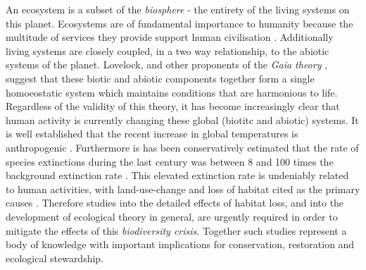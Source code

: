 An ecosystem is a subset of the \emph{biosphere} - the entirety of the living systems on this planet. Ecosystems are of fundamental importance to humanity because the multitude of services they provide support human civilisation  \cite{assessment2005ecosystems}. Additionally living systems are closely coupled, in a two way relationship, to the abiotic systems of the planet. Lovelock, and other proponents of the \emph{Gaia theory} \cite{lovelock1974atmospheric}, suggest that these biotic and abiotic components together form a single homoeostatic system which maintains conditions that are harmonious to life. Regardless of the validity of this theory, it has become increasingly clear that human activity is currently changing these global (biotitc and abiotic) systems. It is well established that the recent increase in global temperatures is anthropogenic \cite{pachauri2015synthesis,staudt2007understanding}. Furthermore is has been conservatively estimated that the rate of species extinctions during the last century was between 8 and 100 times the background extinction rate \cite{ceballos2015accelerated}. This elevated extinction rate is undeniably related to human activities, with land-use-change and loss of habitat cited as the primary causes \cite{foley2005global,newbold2015global}. Therefore studies into the detailed effects of habitat loss, and into the development of ecological theory in general, are urgently required in order to mitigate the effects of this \emph{biodiversity crisis}. Together such studies represent a body of knowledge with important implications for conservation, restoration and ecological stewardship.




